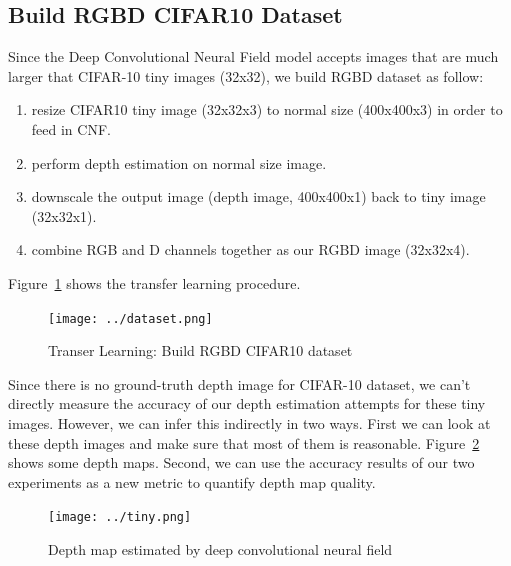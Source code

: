 \documentclass[journal]{IEEEtran}
\begin{document}
\subsection{Build RGBD CIFAR10 Dataset}
Since the Deep Convolutional Neural Field model accepts images that are 
much larger that CIFAR-10 tiny images (32x32), we build RGBD dataset as follow:
\begin{enumerate}
	\item resize CIFAR10 tiny image (32x32x3) to normal size (400x400x3) in order to 
	feed in CNF.
	\item perform depth estimation on normal size image.
	\item downscale the output image (depth image, 400x400x1) back to tiny 
	image (32x32x1).
	\item combine RGB and D channels together as our RGBD image (32x32x4).
\end{enumerate}
Figure~\ref{fig:dataset} shows the transfer learning procedure.
\begin{figure}
	\texttt{[image: ../dataset.png]}
	\caption{Transer Learning: Build RGBD CIFAR10 dataset}
	\label{fig:dataset}
\end{figure}
Since there is no ground-truth depth image for CIFAR-10 dataset, we can\rq{}t directly 
measure the accuracy of our depth estimation attempts for these tiny images. 
However, we can infer this indirectly in two ways.
First we can look at these depth images
and make sure that most of them is reasonable.
Figure~\ref{fig:tiny} shows some depth maps.
Second, we can use the accuracy results of our two experiments as a new metric to 
quantify depth map quality.
\begin{figure}
	\texttt{[image: ../tiny.png]}
	\caption{Depth map estimated by deep convolutional neural field}
	\label{fig:tiny}
\end{figure}
\end{document}
